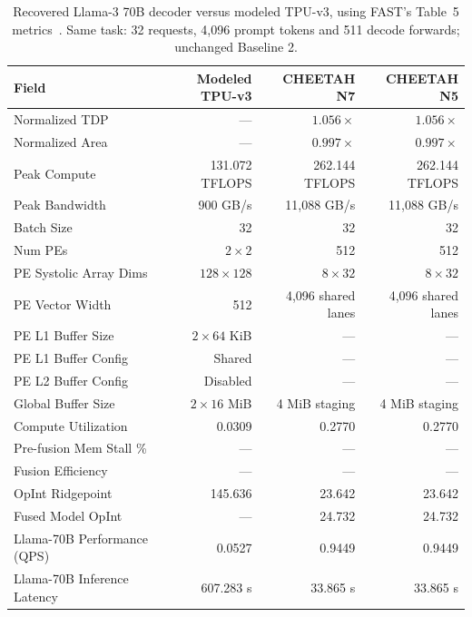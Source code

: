 \begingroup
\setlength{\intextsep}{1pt}
\begin{table}[H]
\centering
\captionsetup{font=footnotesize}
\caption{Recovered Llama-3 70B decoder versus modeled TPU-v3, using FAST's
Table~5 metrics~\citep{zhang_fast}. Same task: 32 requests, 4,096 prompt tokens
and 511 decode forwards; unchanged Baseline 2.}
\label{tab:decoder_blueprint_comparison}
\begingroup
\footnotesize
\setlength{\tabcolsep}{6pt}
\renewcommand{\arraystretch}{0.90}
\begin{tabular*}{\linewidth}{@{\extracolsep{\fill}}lrrr@{}}
\toprule
Field & Modeled TPU-v3 & CHEETAH N7 & CHEETAH N5 \\
\midrule
Normalized TDP & --- & $1.056\times$ & $1.056\times$ \\
Normalized Area & --- & $0.997\times$ & $0.997\times$ \\
Peak Compute & 131.072 TFLOPS & 262.144 TFLOPS & 262.144 TFLOPS \\
Peak Bandwidth & 900 GB/s & 11,088 GB/s & 11,088 GB/s \\
Batch Size & 32 & 32 & 32 \\
Num PEs & $2\times2$ & 512 & 512 \\
PE Systolic Array Dims & $128\times128$ & $8\times32$ & $8\times32$ \\
PE Vector Width & 512 & 4,096 shared lanes & 4,096 shared lanes \\
PE L1 Buffer Size & $2\times64$ KiB & --- & --- \\
PE L1 Buffer Config & Shared & --- & --- \\
PE L2 Buffer Config & Disabled & --- & --- \\
Global Buffer Size & $2\times16$ MiB & 4 MiB staging & 4 MiB staging \\
\midrule
Compute Utilization & 0.0309 & 0.2770 & 0.2770 \\
Pre-fusion Mem Stall \% & --- & --- & --- \\
Fusion Efficiency & --- & --- & --- \\
OpInt Ridgepoint & 145.636 & 23.642 & 23.642 \\
Fused Model OpInt & --- & 24.732 & 24.732 \\
Llama-70B Performance (QPS) & 0.0527 & 0.9449 & 0.9449 \\
Llama-70B Inference Latency & 607.283 s & 33.865 s & 33.865 s \\

\end{tabular*}
\end{table}
